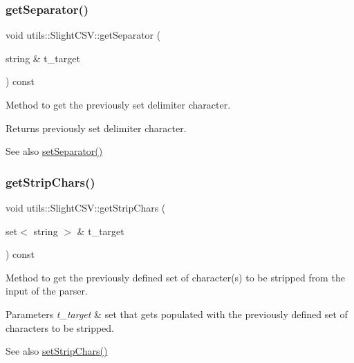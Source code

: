 \subsubsection{\texorpdfstring{get\+Separator()}{getSeparator()}}
{\footnotesize\ttfamily void utils\+::\+Slight\+C\+S\+V\+::get\+Separator (\begin{DoxyParamCaption}\item[{string \&}]{t\+\_\+target }\end{DoxyParamCaption}) const}

Method to get the previously set delimiter character. \begin{DoxyReturn}{Returns}
previously set delimiter character. 
\end{DoxyReturn}
\begin{DoxySeeAlso}{See also}
\hyperlink{classutils_1_1SlightCSV_a1192b4987bbe595ee893ac8fdc7ebd45}{set\+Separator()} 
\end{DoxySeeAlso}
\mbox{\label{classutils_1_1SlightCSV_aa6b302e67d367daab0dc806624a627da}} 
\subsubsection{\texorpdfstring{get\+Strip\+Chars()}{getStripChars()}}
{\footnotesize\ttfamily void utils\+::\+Slight\+C\+S\+V\+::get\+Strip\+Chars (\begin{DoxyParamCaption}\item[{set$<$ string $>$ \&}]{t\+\_\+target }\end{DoxyParamCaption}) const}

Method to get the previously defined set of character(s) to be stripped from the input of the parser. 
\begin{DoxyParams}{Parameters}
{\em t\+\_\+target} & set that gets populated with the previously defined set of characters to be stripped.\\
\hline
\end{DoxyParams}
\begin{DoxySeeAlso}{See also}
\hyperlink{classutils_1_1SlightCSV_ad432022553ea99a4719f618378abe586}{set\+Strip\+Chars()} 
\end{DoxySeeAlso}
\mbox{\label{classutils_1_1SlightCSV_adea079ec76c9ee67d096f8fd39946380}} 
